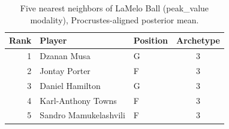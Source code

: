 \begin{table}[htbp]
  \centering\small
  \begin{tabular}{rllc}
    \toprule
    Rank & Player & Position & Archetype \\
    \midrule
    1 & Dzanan Musa & G & 3 \\
    2 & Jontay Porter & F & 3 \\
    3 & Daniel Hamilton & G & 3 \\
    4 & Karl-Anthony Towns & F & 3 \\
    5 & Sandro Mamukelashvili & F & 3 \\
    \bottomrule
  \end{tabular}
  \caption{Five nearest neighbors of LaMelo Ball (peak_value modality), Procrustes-aligned posterior mean.}
  \label{tab:LaMelo_Ball_neighbors_peak_value}
\end{table}

